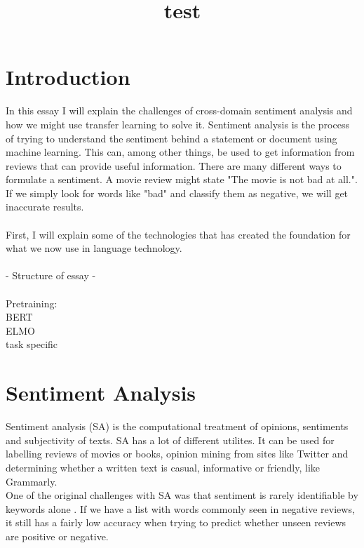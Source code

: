\documentclass{report}
\begin{document}
\title{test}
\duoforside[author={Adrian Eriksen}, dept={Department of Informatics}, program={Language Technology}]

\setcounter{secnumdepth}{0}

\section{Introduction}
In this essay I will explain the challenges of cross-domain sentiment analysis and how we might use transfer learning to solve it.
Sentiment analysis is the process of trying to understand the sentiment behind a statement or document using machine learning. This can, among other things, be used to get information from reviews that can provide useful information.
There are many different ways to formulate a sentiment. A movie review might state "The movie is not bad at all.". If we simply look for words like "bad" and classify them as negative, we will get inaccurate results.\\\\
First, I will explain some of the technologies that has created the foundation for what we now use in language technology.
\\\\  - Structure of essay - \\\\
Pretraining:\\ 
BERT\\
ELMO\\
task specific\\



\newpage
\section{Sentiment Analysis}
Sentiment analysis (SA) is the computational treatment of opinions, sentiments and subjectivity of texts. SA has a lot of different utilites. It can be used for labelling reviews of movies or books, opinion mining from sites like Twitter and determining whether a written text is casual, informative or friendly, like Grammarly.\\
One of the original challenges with SA was that sentiment is rarely identifiable by keywords alone \cite{pang-etal-2002-thumbs}. If we have a list with words commonly seen in negative reviews, it still has a fairly low accuracy when trying to predict whether unseen reviews are positive or negative.
\\\\ 
\end{document}
